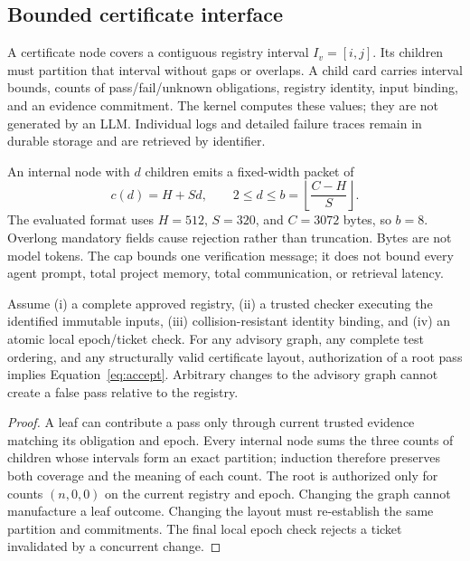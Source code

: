 \documentclass[11pt]{article}
\theoremstyle{definition}\newtheorem{definition}[theorem]{Definition}
\theoremstyle{remark}\newtheorem{remark}[theorem]{Remark}
\begin{document}
\subsection{Bounded certificate interface}
A certificate node covers a contiguous registry interval $I_v=[i,j]$. Its children must partition that interval without gaps or overlaps. A child card carries interval bounds, counts of pass/fail/unknown obligations, registry identity, input binding, and an evidence commitment. The kernel computes these values; they are not generated by an LLM. Individual logs and detailed failure traces remain in durable storage and are retrieved by identifier.

An internal node with $d$ children emits a fixed-width packet of
\begin{equation}\label{eq:packet}
 c(d)=H+Sd,\qquad 2\le d\le b=\left\lfloor\frac{C-H}{S}\right\rfloor.
\end{equation}
The evaluated format uses $H=512$, $S=320$, and $C=3072$ bytes, so $b=8$. Overlong mandatory fields cause rejection rather than truncation. Bytes are not model tokens. The cap bounds one verification message; it does not bound every agent prompt, total project memory, total communication, or retrieval latency.

\begin{proposition}\label{prop:safety}
Assume (i) a complete approved registry, (ii) a trusted checker executing the identified immutable inputs, (iii) collision-resistant identity binding, and (iv) an atomic local epoch/ticket check. For any advisory graph, any complete test ordering, and any structurally valid certificate layout, authorization of a root pass implies Equation~\eqref{eq:accept}. Arbitrary changes to the advisory graph cannot create a false pass relative to the registry.
\end{proposition}
\begin{proof}
A leaf can contribute a pass only through current trusted evidence matching its obligation and epoch. Every internal node sums the three counts of children whose intervals form an exact partition; induction therefore preserves both coverage and the meaning of each count. The root is authorized only for counts $(n,0,0)$ on the current registry and epoch. Changing the graph cannot manufacture a leaf outcome. Changing the layout must re-establish the same partition and commitments. The final local epoch check rejects a ticket invalidated by a concurrent change.\end{proof}
\end{document}
